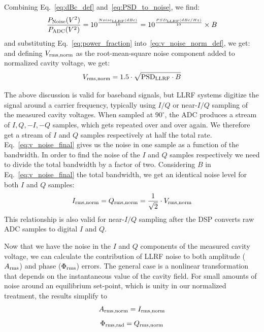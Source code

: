 \documentclass[a4paper,12pt]{article}
\begin{document}
Combining Eq.~\ref{eq:dBc_def} and~\ref{eq:PSD_to_noise}, we find:
\begin{equation}
 \centering \frac{P_{\rm Noise}(V^2)}{P_{\rm ADC}(V^2)} = 10^{\frac{Noise_{\rm LLRF}(dBc)}{10}} = 10^{\frac{PSD_{\rm LLRF}(dBc/Hz)}{10}} \times B
 \label{eq:power_fraction}
\end{equation}
and substituting Eq.~\ref{eq:power_fraction} into~\ref{eq:v_noise_norm_def}, we get:
and defining $V_{\rm rms,norm}$ as the root-mean-square noise component added to
normalized cavity voltage, we get:
\begin{equation}
  \centering V_{\rm rms,norm} = 1.5 \cdot \sqrt{{\rm PSD}_{\rm LLRF} \cdot B}
  \label{eq:v_noise_final}
\end{equation}

The above discussion is valid for baseband signals, but LLRF systems digitize the signal
around a carrier frequency, typically using $I/Q$ or near-$I/Q$ sampling of the measured cavity voltages. When sampled at $90^\circ$, the ADC produces a stream of $I, Q, -I, -Q$ samples, which gets repeated over and over again. We therefore get a stream of $I$ and $Q$ samples respectively at half the total rate. Eq.~\eqref{eq:v_noise_final} gives us the noise in one sample as a function of the bandwidth. In order to find the noise of the $I$ and $Q$ samples respectively we need to divide the total bandwidth by a factor of two. Considering $B$ in Eq.~\eqref{eq:v_noise_final} the total bandwidth, we get an identical noise level for both $I$ and $Q$ samples:
\begin{equation}
  I_{\rm rms,norm}= Q_{\rm rms,norm} = \frac{1}{\sqrt{2}}\cdot V_{\rm rms,norm}
  \label{eq:i_q_vs_v_rms}
\end{equation}
This relationship is also valid for near-$I/Q$ sampling after the DSP converts raw ADC samples to digital
$I$ and $Q$.

Now that we have the noise in the $I$ and $Q$ components of the measured cavity voltage, we can calculate the contribution of LLRF noise to both amplitude ($A_{\rm rms}$) and phase ($\Phi_{\rm rms}$) errors.
The general case is a nonlinear transformation that depends on the instantaneous value of the cavity field.
For small amounts of noise around an equilibrium set-point, which is unity in our normalized treatment,
the results simplify to
\begin{equation}
  A_{\rm rms,norm} = I_{\rm rms,norm}
  \label{eq:a_noise}
\end{equation}
\begin{equation}
  \Phi_{\rm rms,rad} = Q_{\rm rms,norm}
  \label{eq:p_noise}
\end{equation}
\end{document}
